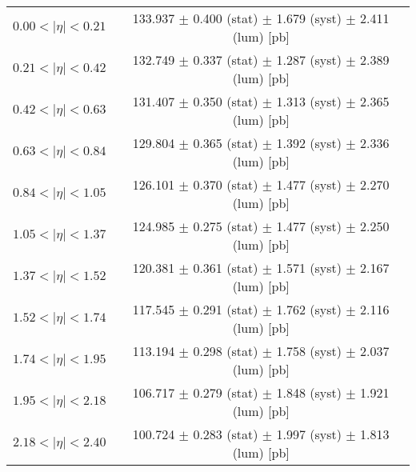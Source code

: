 \begin{tabular}{lc}
\hline
$0.00 < |\eta| <0.21$          & 133.937 $\pm$ 0.400 (stat) $\pm$ 1.679 (syst) $\pm$ 2.411 (lum) [pb]  \\
$0.21 < |\eta| <0.42$          & 132.749 $\pm$ 0.337 (stat) $\pm$ 1.287 (syst) $\pm$ 2.389 (lum) [pb]  \\
$0.42 < |\eta| <0.63$          & 131.407 $\pm$ 0.350 (stat) $\pm$ 1.313 (syst) $\pm$ 2.365 (lum) [pb]  \\
$0.63 < |\eta| <0.84$          & 129.804 $\pm$ 0.365 (stat) $\pm$ 1.392 (syst) $\pm$ 2.336 (lum) [pb]  \\
$0.84 < |\eta| <1.05$          & 126.101 $\pm$ 0.370 (stat) $\pm$ 1.477 (syst) $\pm$ 2.270 (lum) [pb]  \\
$1.05 < |\eta| <1.37$          & 124.985 $\pm$ 0.275 (stat) $\pm$ 1.477 (syst) $\pm$ 2.250 (lum) [pb]  \\
$1.37 < |\eta| <1.52$          & 120.381 $\pm$ 0.361 (stat) $\pm$ 1.571 (syst) $\pm$ 2.167 (lum) [pb]  \\
$1.52 < |\eta| <1.74$          & 117.545 $\pm$ 0.291 (stat) $\pm$ 1.762 (syst) $\pm$ 2.116 (lum) [pb]  \\
$1.74 < |\eta| <1.95$          & 113.194 $\pm$ 0.298 (stat) $\pm$ 1.758 (syst) $\pm$ 2.037 (lum) [pb]  \\
$1.95 < |\eta| <2.18$          & 106.717 $\pm$ 0.279 (stat) $\pm$ 1.848 (syst) $\pm$ 1.921 (lum) [pb]  \\
$2.18 < |\eta| <2.40$          & 100.724 $\pm$ 0.283 (stat) $\pm$ 1.997 (syst) $\pm$ 1.813 (lum) [pb]  \\
\hline
\end{tabular}
